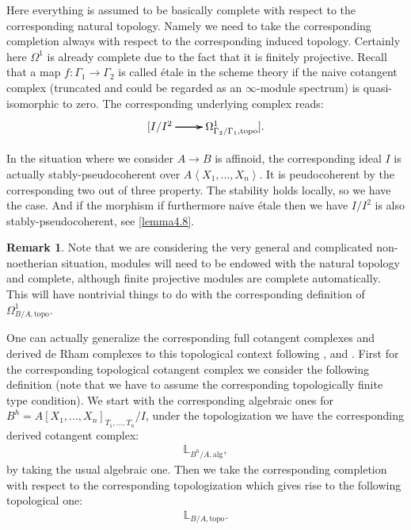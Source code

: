 \documentclass[12pt]{amsart}
\theoremstyle{definition}
\newtheorem{remark}[theorem]{Remark}
\numberwithin{equation}{section}
\begin{document}
Here everything is assumed to be basically complete with respect to the corresponding natural topology. Namely we need to take the corresponding completion always with respect to the corresponding induced topology. Certainly here $\Omega^1$ is already complete due to the fact that it is finitely projective. Recall that a map $f:\Gamma_1\rightarrow \Gamma_2$ is called \'etale in the scheme theory if the naive cotangent complex (truncated and could be regarded as an $\infty$-module spectrum) is quasi-isomorphic to zero. The corresponding underlying complex reads:
\[
\xymatrix@C+0pc@R+0pc{
[I/I^2\ar[r] \ar[r] \ar[r] &\Omega^1_{\Gamma_2/\Gamma_1,\mathrm{topo}}].
}
\]

\indent In the situation where we consider $A\rightarrow B$ is affinoid, the corresponding ideal $I$ is actually stably-pseudocoherent over $A\left<X_1,...,X_n\right>$. It is peudocoherent by the corresponding two out of three property. The stability holds locally, so we have the case. And if the morphism if furthermore naive \'etale then we have $I/I^2$ is also stably-pseudocoherent, see \cref{lemma4.8}. 

\begin{remark}
Note that we are considering the very general and complicated non-noetherian situation, modules will need to be endowed with the natural topology and complete, although finite projective modules are complete automatically. This will have nontrivial things to do with the corresponding definition of $\Omega^1_{B/A,\mathrm{topo}}$.	
\end{remark}


\indent One can actually generalize the corresponding full cotangent complexes and derived de Rham complexes to this topological context following \cite{III1}, \cite{III2} and \cite{B1}. First for the corresponding topological cotangent complex we consider the following definition (note that we have to assume the corresponding topologically finite type condition). We start with the corresponding algebraic ones for $B^h=A[X_1,...,X_n]_{T_1,...,T_n}/I$, under the topologization we have the corresponding derived cotangent complex:
\begin{align}
\mathbb{L}_{B^h/A,\mathrm{alg}},	
\end{align}
by taking the usual algebraic one. Then we take the corresponding completion with respect to the corresponding topologization which gives rise to the following topological one:
\begin{align}
\mathbb{L}_{B/A,\mathrm{topo}}.	
\end{align}
\end{document}
